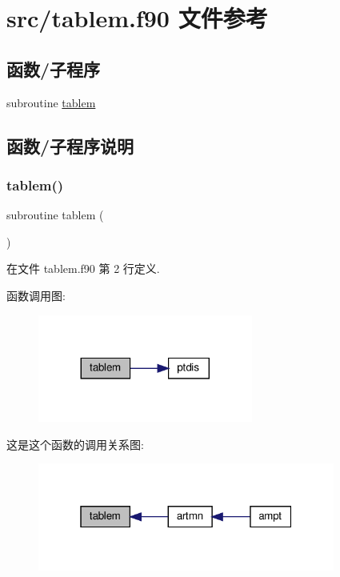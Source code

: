 \hypertarget{tablem_8f90}{}\section{src/tablem.f90 文件参考}
\label{tablem_8f90}
\subsection*{函数/子程序}
\begin{DoxyCompactItemize}
\item 
subroutine \mbox{\hyperlink{tablem_8f90_a41d1cf47ec664b25da8d47fa0ab58764}{tablem}}
\end{DoxyCompactItemize}


\subsection{函数/子程序说明}
\mbox{\label{tablem_8f90_a41d1cf47ec664b25da8d47fa0ab58764}} 
\subsubsection{\texorpdfstring{tablem()}{tablem()}}
{\footnotesize\ttfamily subroutine tablem (\begin{DoxyParamCaption}{ }\end{DoxyParamCaption})}



在文件 tablem.\+f90 第 2 行定义.

函数调用图\+:
\nopagebreak
\begin{figure}[H]
\begin{center}
\leavevmode
\includegraphics[width=200pt]{tablem_8f90_a41d1cf47ec664b25da8d47fa0ab58764_cgraph}
\end{center}
\end{figure}
这是这个函数的调用关系图\+:
\nopagebreak
\begin{figure}[H]
\begin{center}
\leavevmode
\includegraphics[width=277pt]{tablem_8f90_a41d1cf47ec664b25da8d47fa0ab58764_icgraph}
\end{center}
\end{figure}
